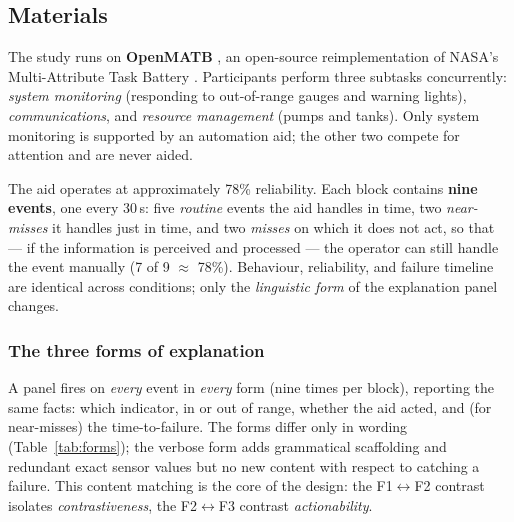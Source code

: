 \documentclass[10pt,twocolumn]{article}
\begin{document}
\subsection{Materials}
The study runs on \textbf{OpenMATB} \parencite{Cegarra2020}, an open-source reimplementation of NASA's Multi-Attribute Task Battery \parencite{Comstock1992}. Participants perform three subtasks concurrently: \textit{system monitoring} (responding to out-of-range gauges and warning lights), \textit{communications}, and \textit{resource management} (pumps and tanks). Only system monitoring is supported by an automation aid; the other two compete for attention and are never aided.

The aid operates at approximately 78\% reliability. Each block contains \textbf{nine events}, one every 30\,s: five \textit{routine} events the aid handles in time, two \textit{near-misses} it handles just in time, and two \textit{misses} on which it does not act, so that --- if the information is perceived and processed --- the operator can still handle the event manually (7 of 9 $\approx$ 78\%). Behaviour, reliability, and failure timeline are identical across conditions; only the \textit{linguistic form} of the explanation panel changes.

\subsubsection{The three forms of explanation}
\label{sec:forms}
A panel fires on \textit{every} event in \textit{every} form (nine times per block), reporting the same facts: which indicator, in or out of range, whether the aid acted, and (for near-misses) the time-to-failure. The forms differ only in wording (Table~\ref{tab:forms}); the verbose form adds grammatical scaffolding and redundant exact sensor values but no new content with respect to catching a failure. This content matching is the core of the design: the F1$\leftrightarrow$F2 contrast isolates \textit{contrastiveness}, the F2$\leftrightarrow$F3 contrast \textit{actionability}.
\end{document}
